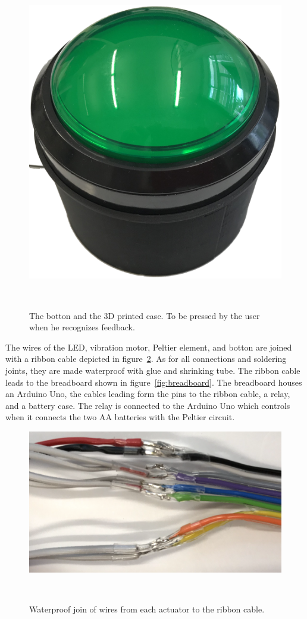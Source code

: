 \begin{figure}
	\includegraphics[width= \textwidth]{images/button.png}
	\caption{The botton and the 3D printed case. To be pressed by the user when he recognizes feedback.}~\label{fig:button}
\end{figure}
The wires of the LED, vibration motor, Peltier element, and botton are joined with a ribbon cable depicted in figure~\ref{fig:wires}.
As for all connections and soldering joints, they are made waterproof with glue and shrinking tube.
The ribbon cable leads to the breadboard shown in figure~\ref{fig:breadboard}.
The breadboard houses an Arduino Uno, the cables leading form the pins to the ribbon cable, a relay, and a battery case.
The relay is connected to the Arduino Uno  which controls when it connects the two AA batteries with the Peltier circuit.


\begin{figure}
	\includegraphics[width= \textwidth]{images/wires.png}
	\caption{Waterproof join of wires from each actuator to the ribbon cable.}~\label{fig:wires}
\end{figure}

